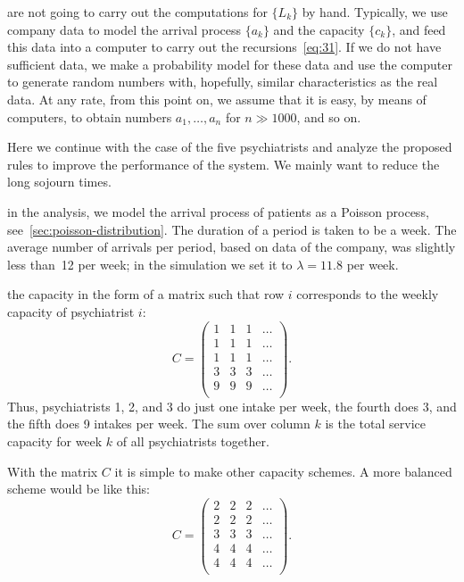   are not going to carry out the computations for $\{L_k\}$ by hand.
 Typically, we use company data to model the arrival process $\{a_k\}$ and the capacity $\{c_k\}$, and feed this data into a computer to carry out the recursions~\cref{eq:31}.
If we do not have sufficient data, we make a probability model for these data and use the computer to generate random numbers with, hopefully, similar characteristics as the real data.
At any rate, from this point on, we assume that it is easy, by means of computers, to obtain numbers $a_1,\ldots, a_n$ for $n\gg 1000$, and so on.




Here we continue with the case of the five psychiatrists and analyze the proposed rules to improve the performance of the system.
We mainly want to reduce the long sojourn times.

 in the analysis, we model the arrival process of patients as a Poisson process, see~\cref{sec:poisson-distribution}.
The duration of a period is taken to be a week.
The average number of arrivals per period, based on data of the company, was slightly less than~12 per week; in the simulation we set it to $\lambda= 11.8$ per week.

 the capacity in the form of a matrix such that row $i$ corresponds to the weekly capacity of psychiatrist $i$:
\begin{equation*}
C =
 \begin{pmatrix}
 1 & 1 & 1 & \ldots\\
 1 & 1 & 1 & \ldots\\
 1 & 1 & 1 & \ldots\\
 3 & 3 & 3 & \ldots\\
 9 & 9 & 9 & \ldots\\
 \end{pmatrix}.
\end{equation*}
Thus, psychiatrists 1, 2, and 3 do just one intake per week, the
fourth does 3, and the fifth does 9 intakes per week. The sum over
column $k$ is the total service capacity for week $k$ of all
psychiatrists together.

With the matrix $C$ it is simple to make other capacity schemes. A
more balanced scheme would be like this:
\begin{equation*}
C =
 \begin{pmatrix}
 2 & 2 & 2 & \ldots\\
 2 & 2 & 2 & \ldots\\
 3 & 3 & 3 & \ldots\\
 4 & 4 & 4 & \ldots\\
 4 & 4 & 4 & \ldots\\
 \end{pmatrix}.
\end{equation*}

